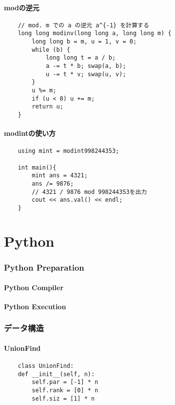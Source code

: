 \documentclass[a4paper, landscape, 9pt]{jarticle} %
\begin{document}
\begin{multicols*}{3}
    \subsection{modの逆元}
    \begin{lstlisting}
    // mod. m での a の逆元 a^{-1} を計算する
    long long modinv(long long a, long long m) {
        long long b = m, u = 1, v = 0;
        while (b) {
            long long t = a / b;
            a -= t * b; swap(a, b);
            u -= t * v; swap(u, v);
        }
        u %= m;
        if (u < 0) u += m;
        return u;
    }
    \end{lstlisting}

    \subsection{modintの使い方}
    \begin{lstlisting}
    using mint = modint998244353;

    int main(){
        mint ans = 4321;
        ans /= 9876;
        // 4321 / 9876 mod 998244353を出力
        cout << ans.val() << endl;
    }
    \end{lstlisting}


    \newpage

    \part{Python}
    \lstset{style=python}
    \setcounter{section}{0}
    \section{Python Preparation}

    \subsection{Python Compiler}

    \subsection{Python Execution}

    \section{データ構造}
    \subsection{UnionFind}
    \begin{lstlisting}
    class UnionFind:
    def __init__(self, n):
        self.par = [-1] * n
        self.rank = [0] * n
        self.siz = [1] * n


\end{lstlisting}
\end{multicols*}
\end{document}
